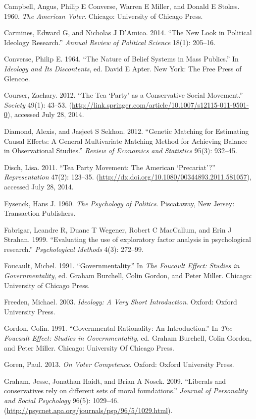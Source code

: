 \documentclass[12pt,]{article}
\begin{document}
Campbell, Angus, Philip E Converse, Warren E Miller, and Donald E
Stokes. 1960. \emph{The American Voter}. Chicago: University of Chicago
Press.

Carmines, Edward G, and Nicholas J D'Amico. 2014. ``The New Look in
Political Ideology Research.'' \emph{Annual Review of Political Science}
18(1): 205--16.

Converse, Philip E. 1964. ``The Nature of Belief Systems in Mass
Publics.'' In \emph{Ideology and Its Discontents}, ed. David E Apter.
New York: The Free Press of Glencoe.

Courser, Zachary. 2012. ``The Tea `Party' as a Conservative Social
Movement.'' \emph{Society} 49(1): 43--53.
(\url{http://link.springer.com/article/10.1007/s12115-011-9501-0}),
accessed July 28, 2014.

Diamond, Alexis, and Jasjeet S Sekhon. 2012. ``Genetic Matching for
Estimating Causal Effects: A General Multivariate Matching Method for
Achieving Balance in Observational Studies.'' \emph{Review of Economics
and Statistics} 95(3): 932--45.

Disch, Lisa. 2011. ``Tea Party Movement: The American `Precariat'?''
\emph{Representation} 47(2): 123--35.
(\url{http://dx.doi.org/10.1080/00344893.2011.581057}), accessed July
28, 2014.

Eysenck, Hans J. 1960. \emph{The Psychology of Politics}. Piscataway,
New Jersey: Transaction Publishers.

Fabrigar, Leandre R, Duane T Wegener, Robert C MacCallum, and Erin J
Strahan. 1999. ``Evaluating the use of exploratory factor analysis in
psychological research.'' \emph{Psychological Methods} 4(3): 272--99.

Foucault, Michel. 1991. ``Governmentality.'' In \emph{The Foucault
Effect: Studies in Governmentality}, ed. Graham Burchell, Colin Gordon,
and Peter Miller. Chicago: University of Chicago Press.

Freeden, Michael. 2003. \emph{Ideology: A Very Short Introduction}.
Oxford: Oxford University Press.

Gordon, Colin. 1991. ``Governmental Rationality: An Introduction.'' In
\emph{The Foucault Effect: Studies in Governmentality}, ed. Graham
Burchell, Colin Gordon, and Peter Miller. Chicago: University Of Chicago
Press.

Goren, Paul. 2013. \emph{On Voter Competence}. Oxford: Oxford University
Press.

Graham, Jesse, Jonathan Haidt, and Brian A Nosek. 2009. ``Liberals and
conservatives rely on different sets of moral foundations.''
\emph{Journal of Personality and Social Psychology} 96(5): 1029--46.
(\url{http://psycnet.apa.org/journals/psp/96/5/1029.html}).
\end{document}

